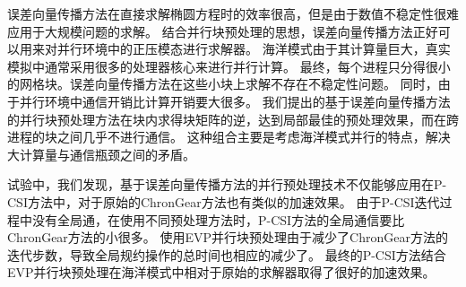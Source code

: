 误差向量传播方法在直接求解椭圆方程时的效率很高，但是由于数值不稳定性很难应用于大规模问题的求解。
结合并行块预处理的思想，误差向量传播方法正好可以用来对并行环境中的正压模态进行求解器。
海洋模式由于其计算量巨大，真实模拟中通常采用很多的处理器核心来进行并行计算。
最终，每个进程只分得很小的网格块。误差向量传播方法在这些小块上求解不存在不稳定性问题。 
同时，由于并行环境中通信开销比计算开销要大很多。
我们提出的基于误差向量传播方法的并行块预处理方法在块内求得块矩阵的逆，达到局部最佳的预处理效果，而在跨进程的块之间几乎不进行通信。
这种组合主要是考虑海洋模式并行的特点，解决大计算量与通信瓶颈之间的矛盾。


试验中，我们发现，基于误差向量传播方法的并行预处理技术不仅能够应用在P-CSI方法中，对于原始的ChronGear方法也有类似的加速效果。
由于P-CSI迭代过程中没有全局通，在使用不同预处理方法时，P-CSI方法的全局通信要比ChronGear方法的小很多。
使用EVP并行块预处理由于减少了ChronGear方法的迭代步数，导致全局规约操作的总时间也相应的减少了。
最终的P-CSI方法结合EVP并行块预处理在海洋模式中相对于原始的求解器取得了很好的加速效果。